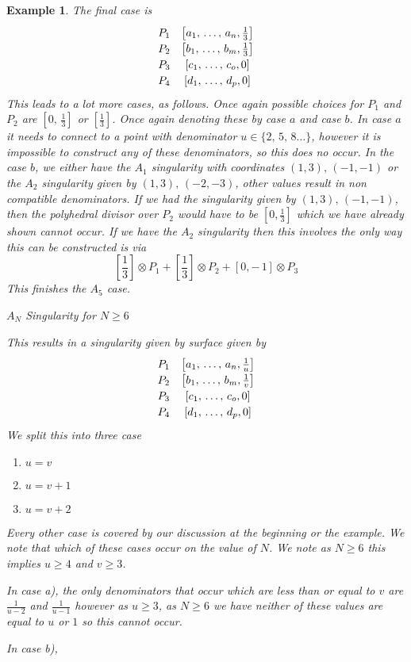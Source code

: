 \documentclass[11pt]{amsart}
\theoremstyle{plain}
\newtheorem{ex}[thm]{Example}
\begin{document}
\begin{ex}
The final case is 
\[\def\arraystretch{1.2}
\begin{array}{cc}
P_1 & \left[ a_1, \, \dots , \, a_n, \frac{1}{3} \right] \\ 
P_2 & \left[b_1 , \, \dots, \, b_m, \frac{1}{3} \right] \\
P_3 & \left[c_1, \, \dots, \, c_o, 0\right] \\
P_4 & \left[d_1, \, \dots, \, d_p, 0\right]  \\
\end{array}
\]
This leads to a lot more cases, as follows. Once again possible choices for $P_1$ and $P_2$ are $\left[ 0, \, \frac{1}{3} \right]$ or $\left[ \frac{1}{3} \right]$. Once again denoting these by case $a$ and case $b$. In case $a$ it needs to connect to a point with denominator $ u \in \{2, \, 5, \, 8 \dots \}$, however it is impossible to construct any of these denominators, so this does no occur. In the case $b$, we either have the $A_1$ singularity with coordinates $(1, 3),\, (-1, -1)$ or the $A_2$ singularity given by $(1, 3),\, (-2, -3)$, other values result in non compatible denominators. If we had the singularity given by $(1, 3),\, (-1, -1)$, then the polyhedral divisor over $P_2$ would have to be $\left[ 0, \frac{1}{3} \right]$ which we have already shown cannot occur. If we have the $A_2$ singularity then this involves the only way this can be constructed is via 
\[
\left[\frac{1}{3} \right] \otimes P_1 + \left[\frac{1}{3} \right] \otimes P_2 + [0, -\, 1] \otimes P_3
\]
This finishes the $A_5$ case.

\item \begin{bf} $A_N$ Singularity for $N \geq 6$ \end{bf}

This results in a singularity given by surface given by 
\[\def\arraystretch{1.2}
\begin{array}{cc}
P_1 & \left[ a_1, \, \dots , \, a_n, \frac{1}{u} \right] \\ 
P_2 & \left[b_1 , \, \dots, \, b_m, \frac{1}{v} \right] \\
P_3 & \left[c_1, \, \dots, \, c_o, 0\right] \\
P_4 & \left[d_1, \, \dots, \, d_p, 0\right]  \\
\end{array}
\]
We split this into three case 
\begin{enumerate}[label =\alph*)]
\item $u = v$
\item $u = v + 1$
\item $u = v + 2$
\end{enumerate}
Every other case is covered by our discussion at the beginning or the example. We note that which of these cases occur on the value of $N$. We note as $N \geq 6$ this implies $u \geq 4$ and $v \geq 3$.

In case a), the only denominators that occur which are less than or equal to $v$ are $\frac{1}{u-2}$ and $\frac{1}{u-1}$ however as $u \geq 3$, as $N \geq 6$ we have neither of these values are equal to $u$ or $1$ so this cannot occur.

In case b), 
\end{ex}
\end{document}
